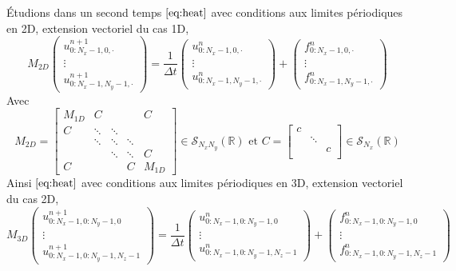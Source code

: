 \documentclass[11pt,a4paper]{article}
\begin{document}
Étudions dans un second temps $\eqref{eq:heat}$ avec conditions aux limites périodiques en 2D, extension vectoriel du cas 1D,
\begin{equation*}
M_{2D}\left(\begin{array}{c}
u_{0:N_x-1, 0, \cdot}^{n+1}\\
\vdots\\
u_{0:N_x-1, N_y-1, \cdot}^{n+1}
\end{array}\right) = \frac{1}{\Delta t} \left(\begin{array}{c}
u_{0:N_x-1, 0, \cdot}^{n}\\
\vdots\\
u_{0:N_x-1, N_y-1, \cdot}^{n}
\end{array}\right) +  \left(\begin{array}{c}
f_{0:N_x-1, 0, \cdot}^{n}\\
\vdots\\
f_{0:N_x-1, N_y-1, \cdot}^{n}
\end{array}\right)
\end{equation*}
Avec
\begin{equation*}
M_{2D} = 
\begin{bmatrix}
M_{1D} &C & & &C \\
C &\ddots &\ddots & & \\
 &\ddots &\ddots &\ddots &  \\
& &\ddots &\ddots  &C\\
C & & &C &M_{1D}
\end{bmatrix}\in\mathcal{S}_{N_xN_y}\left(\mathbb{R}\right)\text{ et }
C = 
\begin{bmatrix}
c & & \\
 &\ddots & \\
 & &c \\
\end{bmatrix}\in\mathcal{S}_{N_x}\left(\mathbb{R}\right)
\end{equation*}
Ainsi $\eqref{eq:heat}$ avec conditions aux limites périodiques en 3D, extension vectoriel du cas 2D,
\begin{equation*}
M_{3D}\left(\begin{array}{c}
u_{0:N_x-1, 0:N_y-1, 0}^{n+1}\\
\vdots\\
u_{0:N_x-1, 0:N_y-1, N_z-1}^{n+1}
\end{array}\right) = \frac{1}{\Delta t}\left(\begin{array}{c}
u_{0:N_x-1, 0:N_y-1, 0}^{n}\\
\vdots\\
u_{0:N_x-1, 0:N_y-1, N_z-1}^{n}
\end{array}\right) + \left(\begin{array}{c}
f_{0:N_x-1, 0:N_y-1, 0}^{n}\\
\vdots\\
f_{0:N_x-1, 0:N_y-1, N_z-1}^{n}
\end{array}\right)
\end{equation*}
\end{document}
